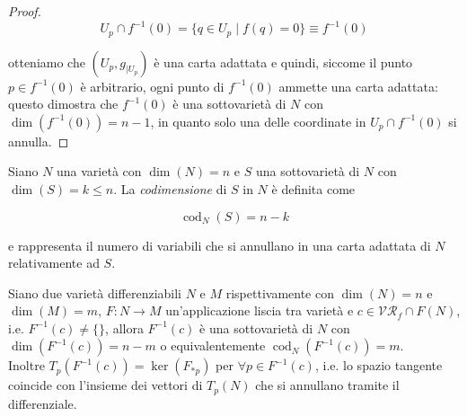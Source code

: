 \begin{proof}
	\begin{equation}
		U_{p} \cap f^{-1}(0) = \{ q \in U_{p} \mid f(q)=0 \} \equiv f^{-1}(0)
	\end{equation}

	otteniamo che $ (U_{p},g_{|U_{p}}) $ è una carta adattata e quindi, siccome il punto $ p \in f^{-1}(0) $ è arbitrario, ogni punto di $ f^{-1}(0) $ ammette una carta adattata: questo dimostra che $ f^{-1}(0) $ è una sottovarietà di $ N $ con $ \dim(f^{-1}(0)) = n-1 $, in quanto solo una delle coordinate in $ U_{p} \cap f^{-1}(0) $ si annulla.
\end{proof}

\begin{definition}
	Siano $ N $ una varietà con $ \dim(N)=n $ e $ S $ una sottovarietà di $ N $ con $ \dim(S)=k \leqslant n $. La \textit{codimensione} di $ S $ in $ N $ è definita come
	
	\begin{equation}
		\operatorname{cod}_{N}(S) = n-k
	\end{equation}

	e rappresenta il numero di variabili che si annullano in una carta adattata di $ N $ relativamente ad $ S $.
\end{definition}

\begin{theorem}
	Siano due varietà differenziabili $ N $ e $ M $ rispettivamente con $ \dim(N)=n $ e $ \dim(M)=m $, $ F : N \to M $ un'applicazione liscia tra varietà e $ c \in \mathcal{VR}_{f} \cap F(N) $, i.e. $ F^{-1}(c) \neq \{\} $, allora $ F^{-1}(c) $ è una sottovarietà di $ N $ con $ \dim(F^{-1}(c)) = n-m $ o equivalentemente $ \operatorname{cod}_{N}(F^{-1}(c)) = m $.\\
	Inoltre $ T_{p}(F^{-1}(c)) = \ker(F_{*p}) $ per $ \forall p \in F^{-1}(c) $, i.e. lo spazio tangente coincide con l'insieme dei vettori di $ T_{p}(N) $ che si annullano tramite il differenziale.
\end{theorem}

